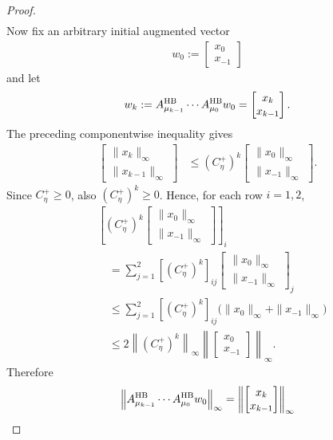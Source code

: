 \documentclass[letterpaper]{article}
\numberwithin{equation}{section}
\begin{document}
\begin{proof}
\begin{align*}
\end{align*}
Now fix an arbitrary initial augmented vector
\begin{align*}
  w_0:=\begin{bmatrix}x_0\\x_{-1}\end{bmatrix}
\end{align*}
and let
\begin{align*}
  w_k:=A_{\mu_{k-1}}^{\rm HB}\cdots A_{\mu_0}^{\rm HB}w_0
  =\begin{bmatrix}x_k\\x_{k-1}\end{bmatrix}.
\end{align*}
The preceding componentwise inequality gives
\begin{align*}
  \begin{bmatrix}\|x_k\|_\infty\\\|x_{k-1}\|_\infty\end{bmatrix}
  &\le
  (C_\eta^+)^k
  \begin{bmatrix}\|x_0\|_\infty\\\|x_{-1}\|_\infty\end{bmatrix}.
\end{align*}
Since $C_\eta^+\ge0$, also $(C_\eta^+)^k\ge0$. Hence, for each row $i=1,2$,
\begin{align*}
&\left[(C_\eta^+)^k
  \begin{bmatrix}\|x_0\|_\infty\\\|x_{-1}\|_\infty\end{bmatrix}\right]_i\\
&\quad=
  \sum_{j=1}^2\left[(C_\eta^+)^k\right]_{ij}
  \begin{bmatrix}\|x_0\|_\infty\\\|x_{-1}\|_\infty\end{bmatrix}_j\\
&\quad\le
  \sum_{j=1}^2\left[(C_\eta^+)^k\right]_{ij}
  \bigl(\|x_0\|_\infty+\|x_{-1}\|_\infty\bigr)\\
&\quad\le
  2\left\|(C_\eta^+)^k\right\|_\infty
  \left\|\begin{bmatrix}x_0\\x_{-1}\end{bmatrix}\right\|_\infty.
\end{align*}
Therefore
\begin{align*}
  \left\|A_{\mu_{k-1}}^{\rm HB}\cdots A_{\mu_0}^{\rm HB}w_0\right\|_\infty
  &=\left\|\begin{bmatrix}x_k\\x_{k-1}\end{bmatrix}\right\|_\infty\\

\end{align*}
\end{proof}
\end{document}
